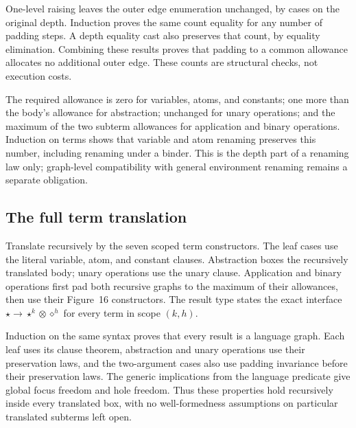 

One-level raising leaves the outer edge enumeration unchanged, by cases
on the original depth. Induction proves the same count equality for any
number of padding steps. A depth equality cast also preserves that count,
by equality elimination. Combining these results proves that padding to
a common allowance allocates no additional outer edge. These counts are
structural checks, not execution costs.





The required allowance is zero for variables, atoms, and constants;
one more than the body's allowance for abstraction; unchanged for unary
operations; and the maximum of the two subterm allowances for application
and binary operations. Induction on terms shows that variable and atom
renaming preserves this number, including renaming under a binder. This
is the depth part of a renaming law only; graph-level compatibility with
general environment renaming remains a separate obligation.



\subsection{The full term translation}

Translate recursively by the seven scoped term constructors. The leaf
cases use the literal variable, atom, and constant clauses. Abstraction
boxes the recursively translated body; unary operations use the unary
clause. Application and binary operations first pad both recursive graphs
to the maximum of their allowances, then use their Figure~16 constructors.
The result type states the exact interface
$\star\to\star^k\otimes\diamond^h$ for every term in scope $(k,h)$.

Induction on the same syntax proves that every result is a language graph.
Each leaf uses its clause theorem, abstraction and unary operations use
their preservation laws, and the two-argument cases also use padding
invariance before their preservation laws. The generic implications from
the language predicate give global focus freedom and hole freedom. Thus
these properties hold recursively inside every translated box, with no
well-formedness assumptions on particular translated subterms left open.

